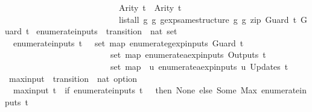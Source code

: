 \begin{isabellebody}
\ \ \ \ \ \ \ \ \ \ \ \ \ \ \ \ \ \ \ \ \ \ \ \ \ \ \ Arity\ t{}\ {\isacharequal}\ Arity\ t{}\ {\isasymand}\isanewline
\ \ \ \ \ \ \ \ \ \ \ \ \ \ \ \ \ \ \ \ \ \ \ \ \ \ \ list{\isacharunderscore}all\ {\isacharparenleft}{\isasymlambda}{\isacharparenleft}g{}{\isacharcomma}\ g{}{\isacharparenright}{\isachardot}\ gexp{\isacharunderscore}same{\isacharunderscore}structure\ g{}\ g{}{\isacharparenright}\ {\isacharparenleft}zip\ {\isacharparenleft}Guard\ t{}{\isacharparenright}\ {\isacharparenleft}Guard\ t{}{\isacharparenright}{\isacharparenright}{\isacharparenright}{\isachardoublequoteclose}\isanewline
\isanewline
{}\isamarkupfalse%
\ enumerate{\isacharunderscore}inputs\ {\isacharcolon}{\isacharcolon}\ {\isachardoublequoteopen}transition\ {\isasymRightarrow}\ nat\ set{\isachardoublequoteclose}\ \isanewline
\ \ {\isachardoublequoteopen}enumerate{\isacharunderscore}inputs\ t\ {\isacharequal}\ {\isacharparenleft}{\isasymUnion}\ {\isacharparenleft}set\ {\isacharparenleft}map\ enumerate{\isacharunderscore}gexp{\isacharunderscore}inputs\ {\isacharparenleft}Guard\ t{\isacharparenright}{\isacharparenright}{\isacharparenright}{\isacharparenright}\ {\isasymunion}\isanewline
\ \ \ \ \ \ \ \ \ \ \ \ \ \ \ \ \ \ \ \ \ \ \ \ {\isacharparenleft}{\isasymUnion}\ {\isacharparenleft}set\ {\isacharparenleft}map\ enumerate{\isacharunderscore}aexp{\isacharunderscore}inputs\ {\isacharparenleft}Outputs\ t{\isacharparenright}{\isacharparenright}{\isacharparenright}{\isacharparenright}\ {\isasymunion}\isanewline
\ \ \ \ \ \ \ \ \ \ \ \ \ \ \ \ \ \ \ \ \ \ \ \ {\isacharparenleft}{\isasymUnion}\ {\isacharparenleft}set\ {\isacharparenleft}map\ {\isacharparenleft}{\isasymlambda}{\isacharparenleft}{\isacharunderscore}{\isacharcomma}\ u{\isacharparenright}{\isachardot}\ enumerate{\isacharunderscore}aexp{\isacharunderscore}inputs\ u{\isacharparenright}\ {\isacharparenleft}Updates\ t{\isacharparenright}{\isacharparenright}{\isacharparenright}{\isacharparenright}{\isachardoublequoteclose}\isanewline
\isanewline
{}\isamarkupfalse%
\ max{\isacharunderscore}input\ {\isacharcolon}{\isacharcolon}\ {\isachardoublequoteopen}transition\ {\isasymRightarrow}\ nat\ option{\isachardoublequoteclose}\ \isanewline
\ \ {\isachardoublequoteopen}max{\isacharunderscore}input\ t\ {\isacharequal}\ {\isacharparenleft}if\ enumerate{\isacharunderscore}inputs\ t\ {\isacharequal}\ {\isacharbraceleft}{\isacharbraceright}\ then\ None\ else\ Some\ {\isacharparenleft}Max\ {\isacharparenleft}enumerate{\isacharunderscore}inputs\ t{\isacharparenright}{\isacharparenright}{\isacharparenright}{\isachardoublequoteclose}\isanewline

\end{isabellebody}
